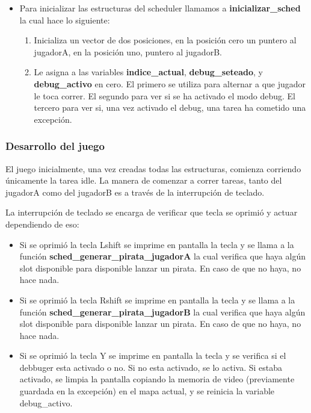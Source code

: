 \documentclass[a4paper,10pt]{article}
\begin{document}
\begin{itemize}
  \item Para inicializar las estructuras del scheduler llamamos a \textbf{inicializar\_sched} la cual
    hace lo siguiente:
    \begin{enumerate}
      \item Inicializa un vector de dos posiciones, en la posición cero un puntero al jugadorA, en la posición uno, puntero al jugadorB.
      \item Le asigna a las variables \textbf{indice\_actual}, \textbf{debug\_seteado}, y \textbf{debug\_activo} en cero.
        El primero se utiliza para alternar a que jugador le toca correr.
        El segundo para ver si se ha activado el modo debug.
        El tercero para ver si, una vez activado el debug, una tarea ha cometido una excepción.
    \end{enumerate}

\end{itemize}

\subsubsection{Desarrollo del juego}
  El juego inicialmente, una vez creadas todas las estructuras, comienza corriendo únicamente la tarea idle.
  La manera de comenzar a correr tareas, tanto del jugadorA como del jugadorB es a través de la interrupción de teclado.

  La interrupción de teclado se encarga de verificar que tecla se oprimió y actuar dependiendo de eso:
  \begin{itemize}
    \item Si se oprimió la tecla Lshift se imprime en pantalla la tecla y se llama a la función \textbf{sched\_generar\_pirata\_jugadorA} la cual verifica que haya algún
      slot disponible para disponible lanzar un pirata. En caso de que no haya, no hace nada. 
    \item Si se oprimió la tecla Rshift se imprime en pantalla la tecla y se llama a la función \textbf{sched\_generar\_pirata\_jugadorB} la cual verifica que haya algún
      slot disponible para disponible lanzar un pirata. En caso de que no haya, no hace nada. 
    \item Si se oprimió la tecla Y se imprime en pantalla la tecla y se verifica si el debbuger esta activado o no.
      Si no esta activado, se lo activa. Si estaba activado, se limpia la pantalla copiando la memoria de video (previamente guardada en la excepción) en el mapa actual,
      y se reinicia la variable debug\_activo. 
  \end{itemize}
   
\end{document}
